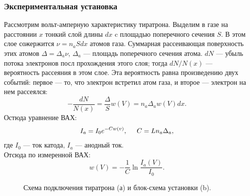 \documentclass[11pt]{article}
\begin{document}
  \subsubsection*{Экспериментальная установка}
  Рассмотрим вольт-амперную характеристику тиратрона. Выделим в газе на расстоянии $x$ тонкий слой длины $dx$ c площадью поперечного сечения $S$. В этом слое сожержится $\nu = n_a S dx$ атомов газа. Суммарная рассеивающая поверхность этих атомов $\Delta = \Delta_a \nu$, $\Delta_a$ --- площадь поперечного сечения атома. $dN$ --- убыль потока электронов посл прохождения этого слоя; тогда $dN/N(x)$ --- вероятность рассеяния в этом слое. Эта вероятность равна произведению двух событий: первое --- то, что электрон встретил атом газа, и второе --- электрон на нем рассеялся:
  \[
   -\frac{dN}{N(x)} = \frac{\Delta}{S}w(V) = n_a\Delta_aw(V)dx.
  \]
  Остюда уравнение ВАХ:
  \[
   I_a = I_0 e^{-Cw(v)}, \hspace{0.5cm} C = Ln_a\Delta_a,
  \]
  где $I_0$ --- ток катода, $I_a$ --- анодный ток. \\
  Отсюда по измеренной ВАХ:
  \begin{equation} \label{w}
   w(V) = -\frac{1}{C}\ln\frac{I_a(V)}{I_0}.
  \end{equation}
  \begin{figure}[H]
\caption{Схема подключения тиратрона (а) и блок-схема установки (b).}
\end{figure}
\end{document}
